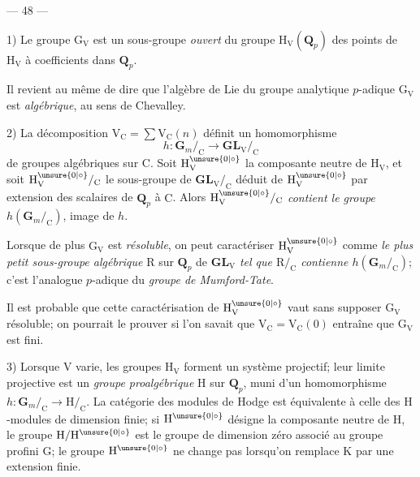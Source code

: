 \begin{center}--- 48 ---\end{center}

1) Le groupe $\mathrm G_{\mathrm V}$ est un sous-groupe \textit{ouvert} du groupe $\mathrm H_{\mathrm V}(\mathbf Q_p)$ des points de $\mathrm H_{\mathrm V}$ à coefficients dans $\mathbf Q_p$.

Il revient au même de dire que l'algèbre de Lie du groupe analytique $p$-adique $\mathrm G_{\mathrm V}$ est \textit{algébrique}, au sens de Chevalley.

2) La décomposition $\mathrm V_{\mathrm C}=\sum\mathrm V_{\mathrm C}(n)$ définit un homomorphisme
\[
h:\mathbf G_m/_{\mathrm C}\to\mathbf{GL}_{\mathrm V}/_{\mathrm C}
\]
de groupes algébriques sur $\mathrm C$. Soit $\mathrm H_{\mathrm V}^{\unsure{0|\circ}}$ la composante neutre de $\mathrm H_{\mathrm V}$, et soit $\mathrm H_{\mathrm V}^{\unsure{0|\circ}}/_{\mathrm C}$ le sous-groupe de $\mathbf{GL}_{\mathrm V}/_{\mathrm C}$ déduit de $\mathrm H_{\mathrm V}^{\unsure{0|\circ}}$ par extension des scalaires de $\mathbf Q_p$ à $\mathrm C$. Alors \textit{$\mathrm H_{\mathrm V}^{\unsure{0|\circ}}/_{\mathrm C}$ contient le groupe $h(\mathbf G_m/_{\mathrm C})$}, image de $h$.

Lorsque de plus $\mathrm G_{\mathrm V}$ est \textit{résoluble}, on peut caractériser $\mathrm H_{\mathrm V}^{\unsure{0|\circ}}$ comme \textit{le plus petit sous-groupe algébrique} $\mathrm R$ sur $\mathbf Q_p$ de $\mathbf{GL}_{\mathrm V}$ \textit{tel que $\mathrm R/_{\mathrm C}$ contienne $h(\mathbf G_m/_{\mathrm C})$}; c'est l'analogue $p$-adique du \textit{groupe de Mumford-Tate}.

Il est probable que cette caractérisation de $\mathrm H_{\mathrm V}^{\unsure{0|\circ}}$ vaut sans supposer $\mathrm G_{\mathrm V}$ résoluble; on pourrait le prouver si l'on savait que $\mathrm V_{\mathrm C}=\mathrm V_{\mathrm C}(0)$ entraîne que $\mathrm G_{\mathrm V}$ est fini.

3) Lorsque $\mathrm V$ varie, les groupes $\mathrm H_{\mathrm V}$ forment un système projectif; leur limite projective est un \textit{groupe proalgébrique} $\mathrm H$ sur $\mathbf Q_p$, muni d'un homomorphisme $h:\mathbf G_m/_{\mathrm C}\to\mathrm H/_{\mathrm C}$. La catégorie des modules de Hodge est équivalente à celle des $\mathrm H$-modules de dimension finie; si $\mathrm H^{\unsure{0|\circ}}$ désigne la composante neutre de $\mathrm H$, le groupe $\mathrm H/\mathrm H^{\unsure{0|\circ}}$ est le groupe de dimension zéro associé au groupe profini $\mathrm G$; le groupe $\mathrm H^{\unsure{0|\circ}}$ ne change pas lorsqu'on remplace $\mathrm K$ par une extension finie.


